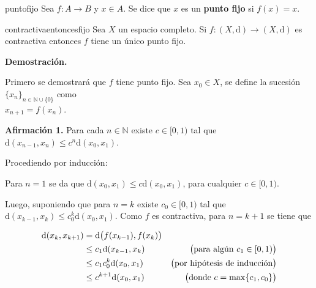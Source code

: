 \documentclass[12pt]{article}
\newenvironment{definicion}[1]{\begin{defi}[breakable, pad at break = 5mm, leftrule = 0.7mm, rightrule = 0.7mm, right = 2mm, left = 2mm, enlarge bottom finally by = 3mm]{}{#1}}{\end{defi}}
\newenvironment{ejercicio}[1]{\begin{ejer}[breakable, pad at break = 5mm, leftrule = 0.7mm, rightrule = 0.7mm, right = 2mm, left = 2mm, enlarge bottom finally by = 3mm, fontlower = \setlength{\parskip}{2mm}]{}{#1}}{\end{ejer}}
\newcommand{\nat}{\mathbb{N}}
\begin{document}

	\begin{definicion}{puntofijo}
		Sea $ f \colon A \to B $ y $ x \in A $. Se dice que $ x $ es un \textbf{punto fijo} si $ f(x) = x $.
	\end{definicion}


	\begin{ejercicio}{contractivaentoncesfijo}
		Sea $ X $ un espacio completo. Si $ f \colon (X, \mathrm{d}) \to (X, \mathrm{d}) $ es contractiva entonces $ f $ tiene un único punto fijo.

		\tcblower

		\textbf{Demostración.}

		Primero se demostrará que $ f $ tiene punto fijo. Sea $ x_0 \in X $, se define la sucesión $ \lbrace x_n \rbrace_{n \in \nat \cup \{0\}} $ como \\ $ x_{n+1} = f(x_n) $. 

		\textbf{Afirmación 1.} Para cada $ n \in \nat $ existe $ c \in [0,1) $ tal que $ \mathrm{d} (x_{n-1}, x_n) \leq c^n \mathrm{d} (x_0, x_1) $. 

		\hfill \begin{minipage}{0.98\linewidth}
			\setlength{\parskip}{1mm}

			Procediendo por inducción:

			Para $ n = 1 $ se da que $ \mathrm{d}(x_0, x_1) \leq c \mathrm{d}(x_0, x_1) $, para cualquier $ c \in [0,1) $.

			Luego, suponiendo que para $ n = k $ existe $ c_0 \in [0,1) $ tal que $ \mathrm{d} (x_{k-1}, x_k) \leq c_0^k \mathrm{d} (x_0, x_1) $. Como $ f $ es contractiva, para $ n = k + 1 $ se tiene que

			\begin{align*}
				\mathrm{d} (x_k, x_{k+1}) &= \mathrm{d} \bigl( f(x_{k-1}), f(x_k) \bigr) & \\
				&\leq c_1 \mathrm{d} (x_{k-1}, x_k) & \bigl( \mbox{para algún $ c_1 \in [0,1) $} \bigr) \\
				&\leq c_1 c_0^k \mathrm{d} (x_0, x_1) & \bigl( \mbox{por hipótesis de inducción} \bigr) \\
				&\leq c^{k+1} \mathrm{d} (x_0, x_1) & \bigl( \mbox{donde $ c = \max \{ c_1, c_0 \} $}\bigr)
			\end{align*}


\end{minipage}
\end{ejercicio}
\end{document}
